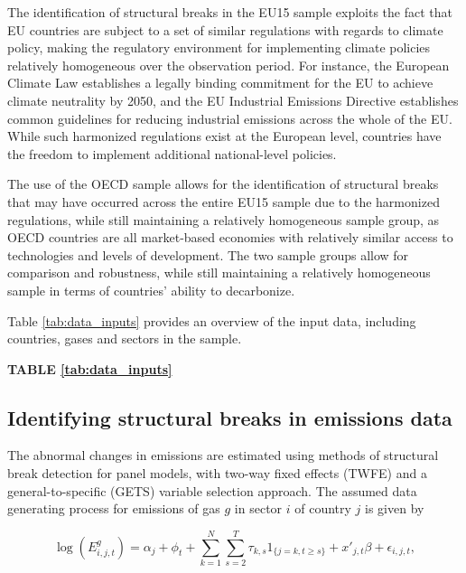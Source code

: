 \documentclass[a4paper]{article}
\begin{document}
The identification of structural breaks in the EU15 sample exploits the fact that EU countries are subject to a set of similar regulations with regards to climate policy, making the regulatory environment for implementing climate policies relatively homogeneous over the observation period. For instance, the European Climate Law establishes a legally binding commitment for the EU to achieve climate neutrality by 2050, and the EU Industrial Emissions Directive establishes common guidelines for reducing industrial emissions across the whole of the EU. While such harmonized regulations exist at the European level, countries have the freedom to implement additional national-level policies.

The use of the OECD sample allows for the identification of structural breaks that may have occurred across the entire EU15 sample due to the harmonized regulations, while still maintaining a relatively homogeneous sample group, as OECD countries are all market-based economies with relatively similar access to technologies and levels of development. The two sample groups allow for comparison and robustness, while still maintaining a relatively homogeneous sample in terms of countries' ability to decarbonize.

Table \ref{tab:data_inputs} provides an overview of the input data, including countries, gases and sectors in the sample.

\bigskip
\begin{center}
    \textbf{TABLE \ref{tab:data_inputs}}
\end{center}

\subsection*{Identifying structural breaks in emissions data}

The abnormal changes in emissions are estimated using methods of structural break detection for panel models, with two-way fixed effects (TWFE) and a general-to-specific (GETS) variable selection approach. \cite{koch2022attributing,pretis2018automated,pretis2022discovering} The assumed data generating process for emissions of gas $g$ in sector $i$ of country $j$ is given by 

\begin{equation}
    \log(E^g_{i,j,t}) = \alpha_{j} + \phi_{t} + \sum_{k=1}^{N} \sum_{s=2}^{T} \tau_{k,s} 1_{\{j=k,t\ge s\}} + x'_{j,t}\beta + \epsilon_{i,j,t},
    \label{eq:general_model}
\end{equation}
\end{document}
